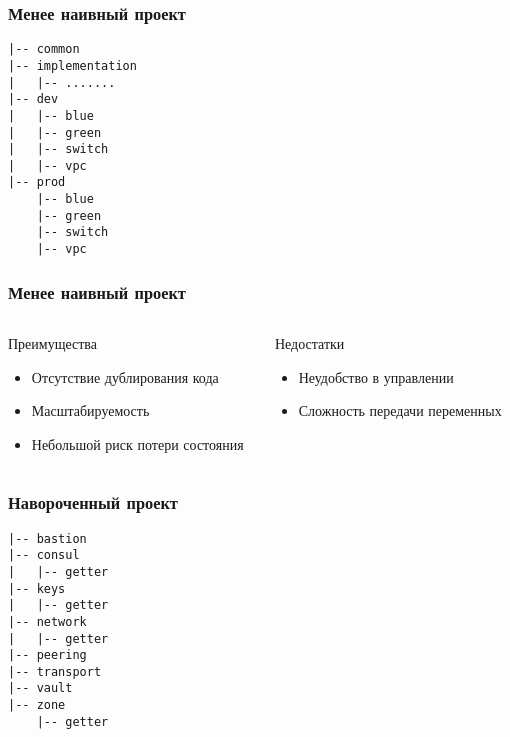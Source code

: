 \documentclass[mathserif,serif]{beamer}
\begin{document}
\begin{frame}[fragile]
	\frametitle{Менее наивный проект}
	\begin{verbatim}
|-- common
|-- implementation
|   |-- .......
|-- dev
|   |-- blue
|   |-- green
|   |-- switch
|   |-- vpc
|-- prod
    |-- blue
    |-- green
    |-- switch
    |-- vpc
	\end{verbatim}
\end{frame}

\begin{frame}
	\frametitle{Менее наивный проект}
	\begin{columns}[T]
		\begin{column}{.5\linewidth}
			\begin{minipage}[c][\textheight][c]{\linewidth}
          			Преимущества
				\begin{itemize}
					\item{Отсутствие дублирования кода}
					\item{Масштабируемость}
					\item{Небольшой риск потери состояния}
				\end{itemize}
			\end{minipage}
		\end{column}
		\begin{column}{.5\linewidth}
			\begin{minipage}[c][\textheight][c]{\linewidth}
          			Недостатки
				\begin{itemize}
					\item{Неудобство в управлении}
					\item{Сложность передачи переменных}
				\end{itemize}
			\end{minipage}
		\end{column}
	\end{columns}
\end{frame}

\begin{frame}[fragile]
	\frametitle{Навороченный проект}
	\begin{verbatim}
|-- bastion
|-- consul
|   |-- getter
|-- keys
|   |-- getter
|-- network
|   |-- getter
|-- peering
|-- transport
|-- vault
|-- zone
    |-- getter
	\end{verbatim}
\end{frame}
\end{document}
